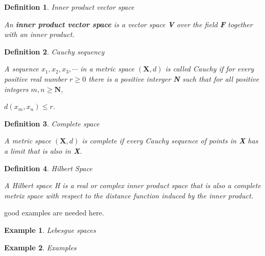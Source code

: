 \documentclass[11pt]{article}
\newtheorem{definition}{Definition}
\newtheorem{example}{Example}
\begin{document}
\begin{definition}{Inner product vector space}

An \textbf{inner product vector space} is a vector space \textbf{V} over the field \textbf{F} together with an inner product.
\end{definition}

\begin{definition}{Cauchy sequency}

A sequence $x_1, x_2, x_3, \cdots$ in a metric space $(\textbf{X}, d)$ is called Cauchy if for every positive real number $r \geq 0$ there is a positive interger \textbf{N} such that for all positive integers $m, n\geq \textbf{N}$,

$d(x_m, x_n)\leq r$.
\end{definition}

\begin{definition}{Complete space}

A metric space $(\textbf{X}, d)$ is complete if every Cauchy sequence of points in \textbf{X} has a limit that is also in \textbf{X}.
\end{definition}

\begin{definition}{Hilbert Space}

A \textit{Hilbert} space \textit{H} is a real or complex inner product space that is also a complete metrix space with respect to the distance function induced by the inner product.

\end{definition}
\color{red}
good examples are needed here.
\begin{example}{Lebesgue spaces}

\end{example}

\begin{example}{Examples}

\end{example}
\end{document}
